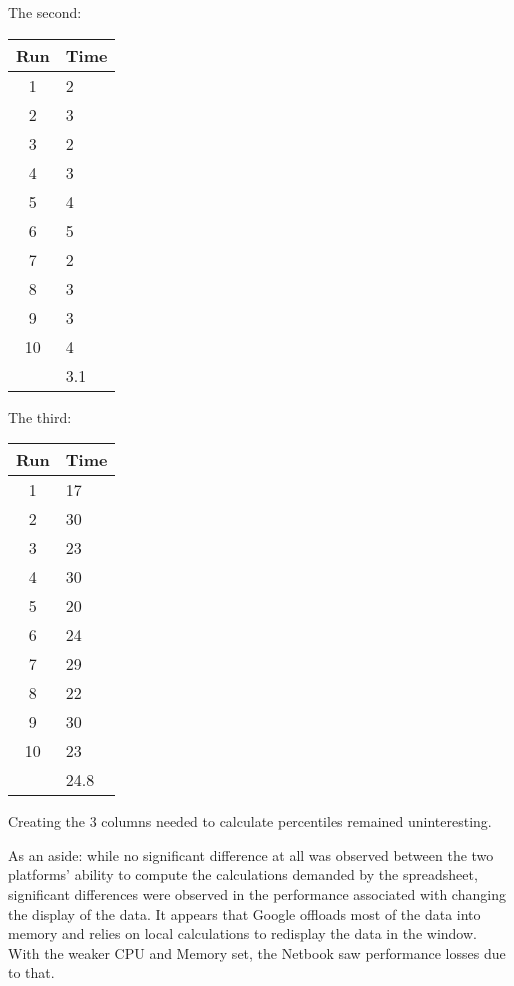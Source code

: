 The second:

\begin{tabular}{| c | l |}
  \hline
  Run  & Time \\ \hline
  1    & 2    \\ \hline
  2    & 3    \\ \hline
  3    & 2    \\ \hline
  4    & 3    \\ \hline
  5    & 4    \\ \hline
  6    & 5    \\ \hline
  7    & 2    \\ \hline
  8    & 3    \\ \hline
  9    & 3    \\ \hline
  10   & 4    \\ \hline
       & 3.1  \\
  \hline
\end{tabular}

The third:

\begin{tabular}{| c | l |}
  \hline
  Run  & Time \\ \hline
  1    & 17   \\ \hline
  2    & 30   \\ \hline
  3    & 23   \\ \hline
  4    & 30   \\ \hline
  5    & 20   \\ \hline
  6    & 24   \\ \hline
  7    & 29   \\ \hline
  8    & 22   \\ \hline
  9    & 30   \\ \hline
  10   & 23   \\ \hline
       & 24.8 \\
  \hline
\end{tabular}

Creating the 3 columns needed to calculate percentiles remained uninteresting.

As an aside: while no significant difference at all was observed between the
two platforms' ability to compute the calculations demanded by the spreadsheet,
significant differences were observed in the performance associated with
changing the display of the data.  It appears that Google offloads most of the
data into memory and relies on local calculations to redisplay the data in the
window.  With the weaker CPU and Memory set, the Netbook saw performance losses
due to that.


